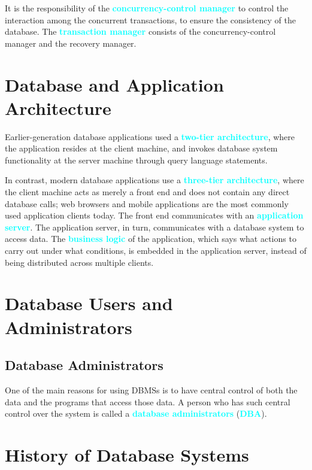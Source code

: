 \documentclass{Beautybook-EN}
\newcommand{\textcy}[1]{\textbf{\textcolor{cyan}{#1}}}
\begin{document}
It is the responsibility of the \textcy{concurrency-control manager} to control the interaction among the concurrent transactions, to ensure the consistency of the database. The \textcy{transaction manager} consists of the concurrency-control manager and the recovery manager.

\section{Database and Application Architecture}

Earlier-generation database applications used a \textcy{two-tier architecture}, where the application resides at the client machine, and invokes database system functionality at the server machine through query language statements.

In contrast, modern database applications use a \textcy{three-tier architecture}, where the client machine acts as merely a front end and does not contain any direct database calls; web browsers and mobile applications are the most commonly used application clients today. The front end communicates with an \textcy{application server}. The application server, in turn, communicates with a database system to access data. The \textcy{business logic} of the application, which says what actions to carry out under what conditions, is embedded in the application server, instead of being distributed across multiple clients.

\section{Database Users and Administrators}
\subsection{Database Administrators}

One of the main reasons for using DBMSs is to have central control of both the data and the programs that access those data. A person who has such central control over the system is called a \textcy{database administrators} (\textcy{DBA}).

\section{History of Database Systems}
\end{document}
